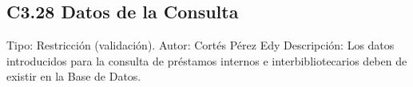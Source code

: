 \subsection{C3.28 Datos de la Consulta}
	\UCli Tipo: Restricción (validación).
	\UCli Autor: Cortés Pérez Edy
	\UCli Descripción: Los datos introducidos para la consulta de préstamos internos e interbibliotecarios deben de existir en la Base de Datos.







